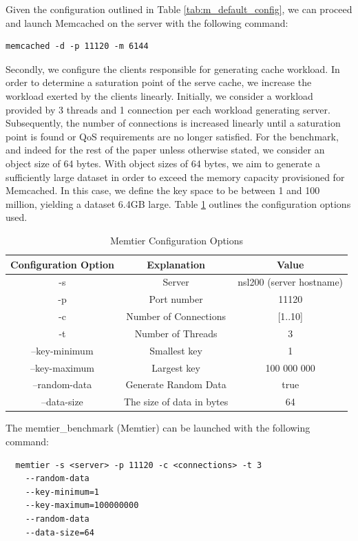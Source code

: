Given the configuration outlined in Table \ref{tab:m_default_config}, we can proceed and launch Memcached on the server with the following command:
\begin{lstlisting}
memcached -d -p 11120 -m 6144
\end{lstlisting}


Secondly, we configure the clients responsible for generating cache workload. In order to determine a saturation point of the serve cache, we increase the workload exerted by the clients linearly. Initially, we consider a workload provided by 3 threads and 1 connection per each workload generating server. Subsequently, the number of connections is increased linearly until a saturation point is found or QoS requirements are no longer satisfied. For the benchmark, and indeed for the rest of the paper unless otherwise stated, we consider an object size of 64 bytes. With object sizes of 64 bytes, we aim to generate a sufficiently large dataset in order to exceed the memory capacity provisioned for Memcached. In this case, we define the key space to be between 1 and 100 million, yielding a dataset 6.4GB large. Table \ref{tab:m_memtier_default} outlines the configuration options used.

\begin{table}[h!]
\centering
\begin{tabular}{| c c c |}
 \hline
 Configuration Option & Explanation & Value\\ [0.5ex]
 \hline\hline

 -s & Server & nsl200 (server hostname) \\
 -p & Port number & 11120 \\
 -c & Number of Connections & [1..10] \\
 -t & Number of Threads & 3 \\
 --key-minimum & Smallest key & 1 \\
 --key-maximum & Largest key & 100 000 000 \\
 --random-data & Generate Random Data & true \\
 --data-size & The size of data in bytes & 64 \\

 \hline

\end{tabular}
\caption{Memtier Configuration Options}
\label{tab:m_memtier_default}
\end{table}

The memtier\_benchmark (Memtier) can be launched with the following command:
\begin{lstlisting}
  memtier -s <server> -p 11120 -c <connections> -t 3
    --random-data
    --key-minimum=1
    --key-maximum=100000000
    --random-data
    --data-size=64
\end{lstlisting}

